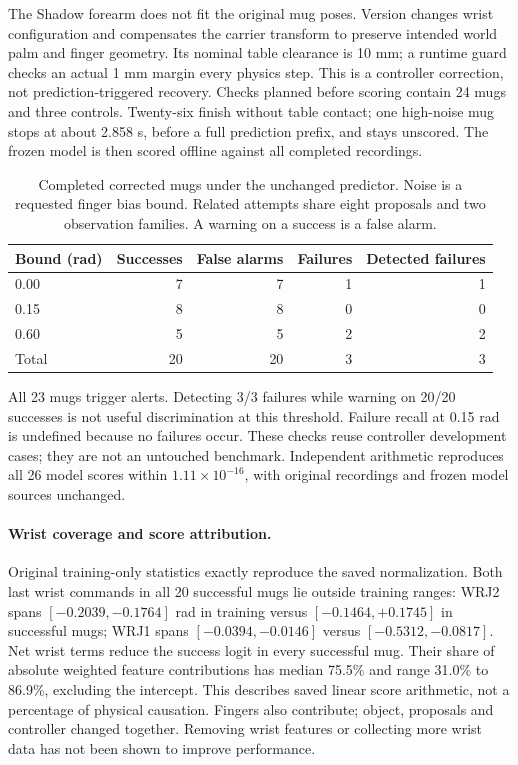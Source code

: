 \documentclass[10pt,letterpaper]{article}
\begin{document}
The Shadow forearm does not fit the original mug poses. Version
 changes wrist configuration and
compensates the carrier transform to preserve intended world palm and finger
geometry. Its nominal table clearance is 10 mm; a runtime guard checks an
actual 1 mm margin every physics step. This is a controller correction, not
prediction-triggered recovery. Checks planned before scoring contain 24 mugs
and three controls. Twenty-six finish without table contact; one high-noise
mug stops at about 2.858 s, before a full prediction prefix, and stays unscored.
The frozen model is then scored offline against all completed recordings.

\begin{table}[ht]
\centering
\caption{Completed corrected mugs under the unchanged predictor. Noise is a
requested finger bias bound. Related attempts share eight proposals and two
observation families. A warning on a success is a false alarm.}
\begin{tabular}{lrrrr}
\toprule
Bound (rad) & Successes & False alarms & Failures & Detected failures\\
\midrule
0.00 & 7 & 7 & 1 & 1\\
0.15 & 8 & 8 & 0 & 0\\
0.60 & 5 & 5 & 2 & 2\\
\midrule
Total & 20 & 20 & 3 & 3\\
\bottomrule
\end{tabular}
\end{table}

All 23 mugs trigger alerts. Detecting 3/3 failures while warning on 20/20
successes is not useful discrimination at this threshold. Failure recall at
0.15 rad is undefined because no failures occur. These checks reuse controller
development cases; they are not an untouched benchmark. Independent arithmetic
reproduces all 26 model scores within $1.11\times10^{-16}$, with original
recordings and frozen model sources unchanged.

\paragraph{Wrist coverage and score attribution.}
Original training-only statistics exactly reproduce the saved normalization.
Both last wrist commands in all 20 successful mugs lie outside training ranges:
WRJ2 spans $[-0.2039,-0.1764]$ rad in training versus
$[-0.1464,+0.1745]$ in successful mugs; WRJ1 spans
$[-0.0394,-0.0146]$ versus $[-0.5312,-0.0817]$.
Net wrist terms reduce the success logit in every successful mug. Their share
of absolute weighted feature contributions has median 75.5\% and range
31.0\% to 86.9\%, excluding the intercept. This describes saved linear score
arithmetic, not a percentage of physical causation. Fingers also contribute;
object, proposals and controller changed together. Removing wrist features
or collecting more wrist data has not been shown to improve performance.
\end{document}
